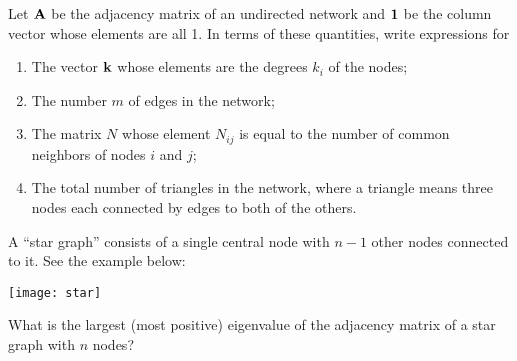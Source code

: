 \documentclass[11pt]{article}
\begin{document}

\newpage
\begin{tcolorbox}[title = 2. (Newman 6.4)]
    Let $\bf{A}$ be the adjacency matrix of an undirected network and $\bf{1}$ be the column vector whose elements are all 1. In terms of these quantities, write expressions for
    \begin{enumerate}
        \item The vector $\bf{k}$ whose elements are the degrees $k_i$ of the nodes;
        \item The number $m$ of edges in the network;
        \item The matrix $N$ whose element $N_{ij}$ is equal to the number of common neighbors of nodes $i$ and $j$;
        \item The total number of triangles in the network, where a triangle means three nodes each connected by edges to both of the others.
    \end{enumerate}
\end{tcolorbox}


\newpage

\begin{tcolorbox}[title = 3. (Newman 6.6)]
    A ``star graph'' consists of a single central node with $n-1$ other nodes connected to it. See the example below:
    \begin{center}
        \texttt{[image: star]}
    \end{center}
What is the largest (most positive) eigenvalue of the adjacency matrix of a star graph with $n$ nodes?
\end{tcolorbox}


\newpage
\end{document}
